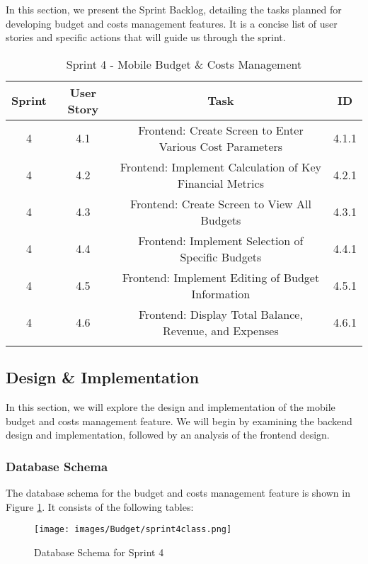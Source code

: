 In this section, we present the Sprint Backlog, detailing the tasks planned for developing budget and costs management features. It is a concise list of user stories and specific actions that will guide us through the sprint.

\setlength{\LTleft}{0pt}
\begin{longtable}{|c|c|c|c|}
\hline
\textbf{Sprint} & \textbf{User Story} & \textbf{Task} & \textbf{ID} \\
\hline
4 & 4.1 & Frontend: Create Screen to Enter Various Cost Parameters & 4.1.1 \\
\hline
4 & 4.2 & Frontend: Implement Calculation of Key Financial Metrics & 4.2.1 \\
\hline
4 & 4.3 & Frontend: Create Screen to View All Budgets & 4.3.1 \\
\hline
4 & 4.4 & Frontend: Implement Selection of Specific Budgets & 4.4.1 \\
\hline
4 & 4.5 & Frontend: Implement Editing of Budget Information & 4.5.1 \\
\hline
4 & 4.6 & Frontend: Display Total Balance, Revenue, and Expenses & 4.6.1 \\
\hline
\caption{Sprint 4 - Mobile Budget \& Costs Management}
\label{tab:sprint4_backlog}
\end{longtable}


\subsection{Design \& Implementation}

In this section, we will explore the design and implementation of the mobile budget and costs management feature. We will begin by examining the backend design and implementation, followed by an analysis of the frontend design.

\subsubsection{Database Schema}

The database schema for the budget and costs management feature is shown in Figure \ref{fig:db_schema_sprint4}. It consists of the following tables:

\begin{figure}[H]
    \centering
    \texttt{[image: images/Budget/sprint4class.png]}
    \caption{Database Schema for Sprint 4}
    \label{fig:db_schema_sprint4}
\end{figure}

